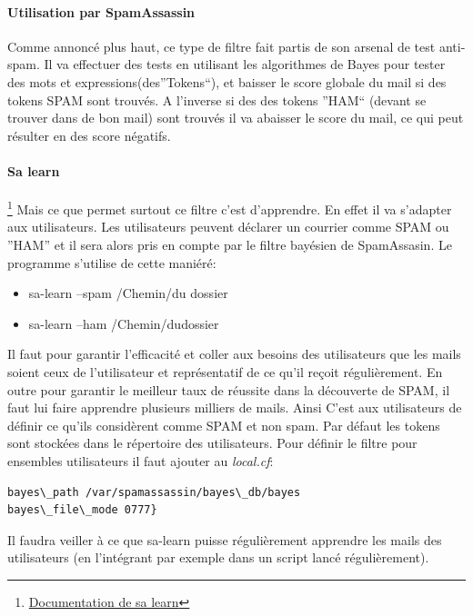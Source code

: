 \documentclass[a4paper,11pt]{article}
\begin{document}
\paragraph{Utilisation par SpamAssassin}

Comme annoncé plus haut, ce type de filtre fait partis de son arsenal de test anti-spam. Il va effectuer des tests 
en utilisant les algorithmes de Bayes pour tester des mots et expressions(des''Tokens``), et baisser le score globale du mail si des tokens SPAM sont trouvés. 
A l'inverse si des des tokens ''HAM`` (devant se trouver dans de bon mail) sont trouvés il va abaisser le score du mail, ce qui peut résulter en
des score négatifs.
\linebreak

\paragraph{Sa learn}\footnote{\href{https://spamassassin.apache.org/full/3.1.x/doc/sa-learn.html}{Documentation de sa learn}}
Mais ce que permet surtout ce filtre c'est d'apprendre. En effet il va s'adapter aux utilisateurs. Les utilisateurs
peuvent déclarer un courrier comme SPAM ou ''HAM'' et il sera alors pris en compte par le filtre bayésien de SpamAssasin.
Le programme s'utilise de cette maniéré:
\begin{itemize}
 \item sa-learn --spam /Chemin/du dossier
 \item sa-learn --ham /Chemin/dudossier
\end{itemize}
Il faut pour garantir l'efficacité et coller aux besoins des utilisateurs que les mails soient ceux de l’utilisateur 
et représentatif de ce qu'il reçoit régulièrement. En outre pour garantir le meilleur taux de réussite
dans la découverte de SPAM, il faut lui faire apprendre plusieurs milliers de mails. Ainsi C'est aux utilisateurs de définir 
ce qu'ils considèrent comme SPAM et non spam. 
\linebreak
Par défaut les tokens sont stockées dans le répertoire des utilisateurs. Pour définir le filtre pour ensembles utilisateurs il faut ajouter 
au \emph{local.cf}:
\begin{lstlisting}[frame=single]
bayes\_path /var/spamassassin/bayes\_db/bayes
bayes\_file\_mode 0777}
\end{lstlisting}
Il faudra veiller à ce que sa-learn puisse régulièrement apprendre les mails des utilisateurs (en l'intégrant par exemple dans un script lancé régulièrement).
\linebreak
\end{document}
